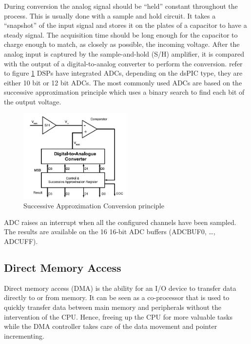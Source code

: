 \vskip 0.2in
\noindent
During conversion the analog signal should be ``held'' constant throughout the process. This is usually done with a sample and hold circuit. It takes a ``snapshot'' of the input signal and stores it on the plates of a capacitor to have a steady signal. The acquisition time should be long enough for the capacitor to charge enough to match, as closely as possible, the incoming voltage.
\vskip 0.2in
\noindent
After the analog input is captured by the sample-and-hold (S/H) amplifier, it is compared with the output of a digital-to-analog converter to perform the conversion. refer to figure \ref{fig:sac} 
\vskip 0.2in
\noindent
DSPs have integrated ADCs, depending on the dsPIC type, they are either 10 bit or 12 bit ADCs.  The most commonly used ADCs are based on the successive approximation principle which uses a binary search to find each bit of the output voltage.\\

\begin{figure}[H]
    \centering
    \includegraphics[width=0.5\textwidth]{figures/software/SAC.PNG}
    \caption{Successive Approximation Conversion principle\cite{alex}}
    \label{fig:sac}
\end{figure}
\noindent
ADC raises an interrupt when all the configured channels have been sampled. The results are available on the 16 16-bit ADC buffers (ADCBUF0, …, ADCUFF).


\subsection{Direct Memory Access}

Direct memory access (DMA) is the ability for an I/O device to transfer data directly to or from memory.  It can be seen as a co-processor that is used to quickly transfer data between main memory and peripherals without the intervention of the CPU. Hence, freeing up the CPU for more valuable tasks while the DMA controller takes care of the data movement and pointer incrementing.


